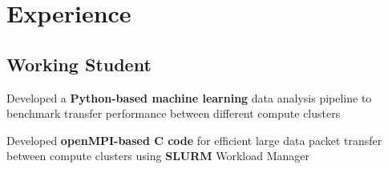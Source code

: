 \documentclass[letterpaper]{deedy-resume} %
\begin{document}
\begin{minipage}[t]{0.62\textwidth} %


\section{Experience}

\subsection{Working Student} 
\begin{tightitemize}

    \item{
        \vspace{\topsep} %
            \begin{tightitemize}
                \item Developed a {\bf Python-based machine learning} data analysis pipeline to benchmark transfer performance between different compute clusters
                \item Developed {\bf openMPI-based C code} for efficient large data packet transfer between compute clusters using {\bf SLURM} Workload Manager
            \end{tightitemize}
        }
    \item{ 
        \vspace{\topsep}
            \begin{tightitemize}

\end{tightitemize}}
\end{tightitemize}
\end{minipage}
\end{document}
